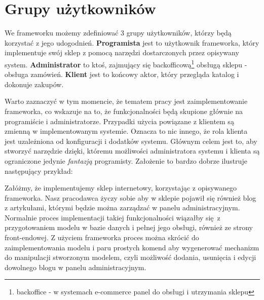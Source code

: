 \section{Grupy użytkowników}
We frameworku możemy zdefiniować 3 grupy użytkowników, którzy będą korzystać z jego udogodnień. \textbf{Programista} jest to użytkownik frameworka, który implementuje swój sklep z pomocą narzędzi dostarczonych przez opisywany system. \textbf{Administrator} to ktoś, zajmujący się backofficową\footnote{backoffice - w systemach e-commerce panel do obsługi i utrzymania sklepu} obsługą sklepu - obsługa zamówień. \textbf{Klient} jest to końcowy aktor, który przegląda katalog i dokonuje zakupów. 

Warto zaznaczyć w tym momencie, że tematem pracy jest zaimplementowanie frameworka, co wskazuje na to, że funkcjonalności będą skupione głównie na programiście i administratorze. Przypadki użycia powiązane z klientem są zmienną w implementowanym systemie. Oznacza to nic innego, że rola klienta jest uzależniona od konfiguracji i dodatków systemu. Głównym celem jest to, aby stworzyć narzędzie dzięki, któremu możliwości administratora systemu i klienta są ograniczone jedynie \textit{fantazją} programisty. Założenie to bardzo dobrze ilustruje następujący przykład:
\begin{example}
	Załóżmy, że implementujemy sklep internetowy, korzystając z opisywanego frameworka. Nasz pracodawca życzy sobie aby w sklepie pojawił się również blog z artykułami, którymi będzie można zarządzać w panelu administracyjnym. Normalnie proces implementacji takiej funkcjonalności wiązałby się z przygotowaniem modelu w bazie danych i pełnej jego obsługi, również ze strony front-endowej. Z użyciem frameworka proces można skrócić do zaimplementowania modelu i paru prostych komend aby wygenerować mechanizm do manipulacji stworzonym modelem, czyli możliwość dodania, usunięcia i edycji dowolnego blogu w panelu administracyjnym.
\end{example}

